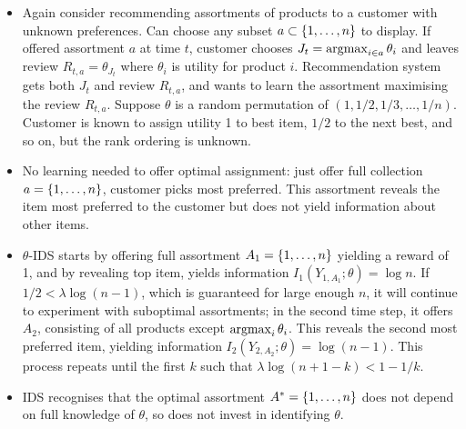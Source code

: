 \documentclass[11pt, openany]{book}
\begin{document}
\begin{example}
    \vspace*{-20pt}
    \begin{itemize}
        \item Again consider recommending assortments of products to a customer with unknown preferences. Can choose any subset $a\subset\left\lbrace1,\dots,n\right\rbrace$ to display. If offered assortment $a$ at time $t$, customer chooses $J_t=\operatorname*{argmax}_{i\in a} \theta_i$ and leaves review $R_{t,a}=\theta_{J_t}$ where $\theta_i$ is utility for product $i$. Recommendation system gets both $J_t$ and review $R_{t,a}$, and wants to learn the assortment maximising the review $R_{t,a}$. Suppose $\theta$ is a random permutation of $(1,1/2,1/3,\dots,1/n)$. Customer is known to assign utility 1 to best item, $1/2$ to the next best, and so on, but the rank ordering is unknown.
        \item No learning needed to offer optimal assignment: just offer full collection $a=\left\lbrace1,\dots,n\right\rbrace$, customer picks most preferred. This assortment reveals the item most preferred to the customer but does not yield information about other items. 
        \item $\theta$-IDS starts by offering full assortment $A_1=\left\lbrace1,\dots,n\right\rbrace$ yielding a reward of 1, and by revealing top item, yields information $I_1(Y_{1,A_1};\theta)=\log n$. If $1/2<\lambda\log(n-1)$, which is guaranteed for large enough $n$, it will continue to experiment with suboptimal assortments; in the second time step, it offers $A_2$, consisting of all products except $\operatorname*{argmax}_i\theta_i$. This reveals the second most preferred item, yielding information $I_2(Y_{2,A_2};\theta)=\log(n-1)$. This process repeats until the first $k$ such that $\lambda\log(n+1-k) < 1-1/k$.
        \item IDS recognises that the optimal assortment $A^*=\left\lbrace1,\dots,n\right\rbrace$ does not depend on full knowledge of $\theta$, so does not invest in identifying $\theta$.
    \end{itemize}
\end{example}
\end{document}
